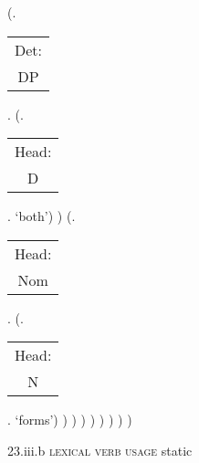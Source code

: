 \documentclass[12pt,letterpaper]{article}
\begin{document}
\begin{figure}
\begin{center}
\begin{parsetree}
			(.\begin{tabular}{c}Det:\\DP\end{tabular}.  
			(.\begin{tabular}{c}Head:\\D\end{tabular}. `both')
			)
			(.\begin{tabular}{c}Head:\\Nom\end{tabular}.
			(.\begin{tabular}{c}Head:\\N\end{tabular}. `forms')
			)
			)
			)
			)
			)
			)
			)
			)
			
		\end{parsetree}
		\hfill \break \hfill \break
		23.iii.b \textsc{lexical verb usage} static
	\end{center}
\end{figure}
\end{document}
